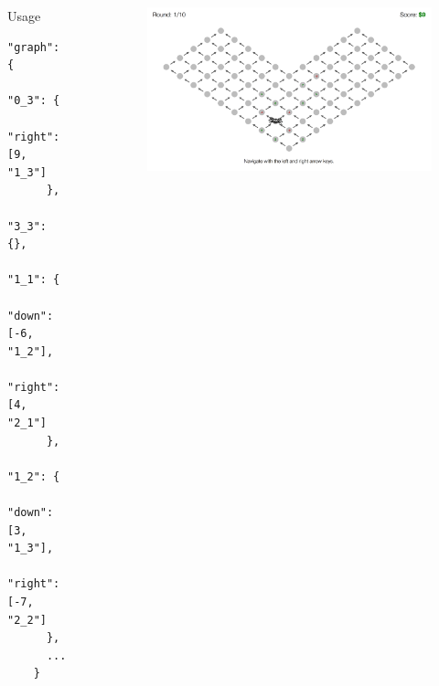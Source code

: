 \documentclass[final]{beamer}
\newlength{\sepwid}
\newlength{\onecolwid}
\newlength{\twocolwid}
\begin{document}
\begin{frame}[t, fragile]
\begin{columns}[t]
\begin{column}{\onecolwid}
  \begin{block}{Usage}\label{usage}
    \begin{Verbatim}[fontsize=\small]
    "graph": {
      "0_3": {
        "right": [9, "1_3"]
      },
      "3_3": {},
      "1_1": {
        "down": [-6, "1_2"],
        "right": [4, "2_1"]
      },
      "1_2": {
        "down": [3, "1_3"],
        "right": [-7, "2_2"]
      },
      ...
    }
    \end{Verbatim}
  \end{block}

\end{column} %

\begin{column}{\sepwid}\end{column} %
\begin{column}{\twocolwid} %

  \begin{figure}
    \includegraphics[width=0.9\linewidth]{figs/heart.png}
  \end{figure}


  \begin{columns}[t,totalwidth=\twocolwid] %
    
    \begin{column}{\onecolwid} %
      

\end{column}
\end{columns}
\end{column}
\end{columns}
\end{frame}
\end{document}

